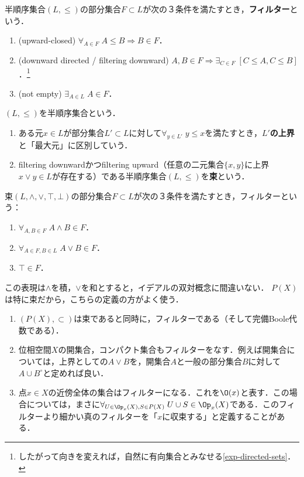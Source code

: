 \documentclass[uplatex,dvipdfmx]{jsreport}
\begin{document}
\begin{definition}[filter]
    半順序集合$(L,\le)$の部分集合$F\subset L$が次の３条件を満たすとき，\textbf{フィルター}という．
    \begin{enumerate}
        \item (upward-closed) $\forall_{A\in F}\;A\le B\Rightarrow B\in F$．
        \item (downward directed / filtering downward) $A,B\in F\Rightarrow \exists_{C\in F}\;[C\le A,C\le B]$．\footnote{したがって向きを変えれば，自然に有向集合とみなせる\ref{exp-directed-sets}．}
        \item (not empty) $\exists_{A\in L}\; A\in F$．
    \end{enumerate}
\end{definition}

\begin{definition}
    $(L,\le)$を半順序集合という．
    \begin{enumerate}
        \item ある元$x\in L$が部分集合$L'\subset L$に対して$\forall_{y\in L'}\;y\le x$を満たすとき，\textbf{$L'$の上界}と「最大元」に区別していう．
        \item filtering downwardかつfiltering upward（任意の二元集合$\{x,y\}$に上界$x\lor y\in L$が存在する）である半順序集合$(L,\le)$を\textbf{束}という．
    \end{enumerate}
\end{definition}
\begin{remark}[束がフィルターになる条件]
    束$(L,\land,\lor,\top,\bot)$の部分集合$F\subset L$が次の３条件を満たすとき，フィルターという：
    \begin{enumerate}
        \item $\forall_{A,B\in F}\;A\land B\in F$．
        \item $\forall_{A\in F,B\in L}\;A\lor B\in F$．
        \item $\top\in F$．
    \end{enumerate}
    この表現は$\land$を積，$\lor$を和とすると，イデアルの双対概念に間違いない．
    $P(X)$は特に束だから，こちらの定義の方がよく使う．
\end{remark}

\begin{example}\mbox{}\label{exp-filter-of-neighbourhood}
    \begin{enumerate}
        \item $(P(X),\subset)$は束であると同時に，フィルターである（そして完備Boole代数である）．
        \item 位相空間$X$の開集合，コンパクト集合もフィルターをなす．例えば開集合については，上界としての$A\lor B$を，開集合$A$と一般の部分集合$B$に対して$A\cup B^\circ$と定めれば良い．
        \item 点$x\in X$の近傍全体の集合はフィルターになる．これを$\O(x)$と表す．この場合については，まさに$\forall_{U\in\Op_x(X),S\in P(X)}\;U\cup S\in\Op_x(X)$である．このフィルターより細かい真のフィルターを「$x$に収束する」と定義することがある．
    \end{enumerate}
\end{example}
\end{document}
